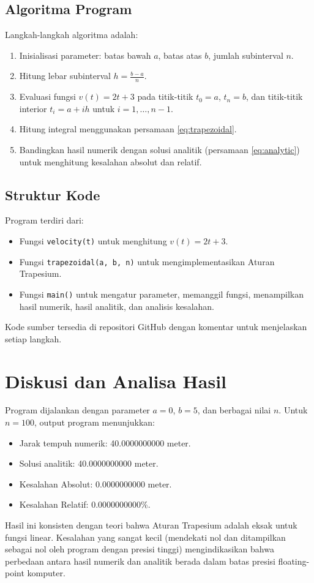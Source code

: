 \documentclass[conference]{IEEEtran}
\begin{document}
\subsection{Algoritma Program}
Langkah-langkah algoritma adalah:
\begin{enumerate}
    \item Inisialisasi parameter: batas bawah \( a \), batas atas \( b \), jumlah subinterval \( n \).
    \item Hitung lebar subinterval \( h = \frac{b-a}{n} \).
    \item Evaluasi fungsi \( v(t) = 2t + 3 \) pada titik-titik \( t_0 = a \), \( t_n = b \), dan titik-titik interior \( t_i = a + i h \) untuk \( i = 1, \ldots, n-1 \).
    \item Hitung integral menggunakan persamaan \eqref{eq:trapezoidal}.
    \item Bandingkan hasil numerik dengan solusi analitik (persamaan \eqref{eq:analytic}) untuk menghitung kesalahan absolut dan relatif.
\end{enumerate}

\subsection{Struktur Kode}
Program terdiri dari:
\begin{itemize}
    \item Fungsi \texttt{velocity(t)} untuk menghitung \( v(t) = 2t + 3 \).
    \item Fungsi \texttt{trapezoidal(a, b, n)} untuk mengimplementasikan Aturan Trapesium.
    \item Fungsi \texttt{main()} untuk mengatur parameter, memanggil fungsi, menampilkan hasil numerik, hasil analitik, dan analisis kesalahan.
\end{itemize}
Kode sumber tersedia di repositori GitHub \cite{b2} dengan komentar untuk menjelaskan setiap langkah.

\section{Diskusi dan Analisa Hasil}
Program dijalankan dengan parameter \( a = 0 \), \( b = 5 \), dan berbagai nilai \( n \). Untuk \( n = 100 \), output program menunjukkan:
\begin{itemize}
    \item Jarak tempuh numerik: 40.0000000000 meter.
    \item Solusi analitik: 40.0000000000 meter.
    \item Kesalahan Absolut: 0.0000000000 meter.
    \item Kesalahan Relatif: 0.0000000000\%.
\end{itemize}
Hasil ini konsisten dengan teori bahwa Aturan Trapesium adalah eksak untuk fungsi linear. Kesalahan yang sangat kecil (mendekati nol dan ditampilkan sebagai nol oleh program dengan presisi tinggi) mengindikasikan bahwa perbedaan antara hasil numerik dan analitik berada dalam batas presisi floating-point komputer.
\end{document}
